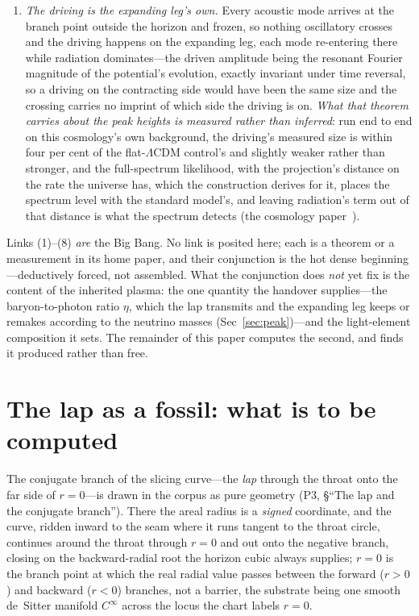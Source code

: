 \documentclass[11pt,a4paper]{article}
\theoremstyle{plain}
\theoremstyle{definition}
\theoremstyle{remark}
\begin{document}
\begin{enumerate}
\item \emph{The driving is the expanding leg's own.} Every acoustic mode arrives at the branch point outside
the horizon and frozen, so nothing oscillatory crosses and the driving happens on the expanding leg, each mode
re-entering there while radiation dominates---the driven amplitude being the resonant Fourier magnitude of the
potential's evolution, exactly invariant under time reversal, so a driving on the contracting side would have
been the same size and the crossing carries no imprint of which side the driving is on.
\emph{What that theorem carries about the peak heights is measured rather than inferred}: run end to end on
this cosmology's own background, the driving's measured size is within four per cent of the
flat-$\Lambda$CDM control's and slightly weaker rather than stronger, and the full-spectrum likelihood,
with the projection's distance on the rate the universe has, which the construction derives for it, places the spectrum level with the standard model's, and leaving radiation's term out of that distance is what the spectrum detects (the cosmology paper~\cite{JanzenCRcosmology}).
\end{enumerate}

Links (1)--(8) \emph{are} the Big Bang. No link is posited here; each is a theorem or a
measurement in its home paper, and their conjunction is the hot dense beginning---deductively
forced, not assembled. What the conjunction does \emph{not} yet fix is the content of the
inherited plasma: the one quantity the handover supplies---the baryon-to-photon ratio $\eta$, which the
lap transmits and the expanding leg keeps or remakes according to the neutrino masses
(Sec~\ref{sec:peak})---and the light-element composition it sets. The remainder of this paper
computes the second, and finds it produced rather than free.

\section{The lap as a fossil: what is to be computed}\label{sec:lap}
The conjugate branch of the slicing curve---the \emph{lap} through the throat onto the far side of
$r=0$---is drawn in the corpus as pure geometry (P3, \S``The lap and the conjugate branch''). There
the areal radius is a \emph{signed} coordinate, and the curve, ridden inward to the seam where it
runs tangent to the throat circle, continues around the throat through $r=0$ and out onto the
negative branch, closing on the backward-radial root the horizon cubic always supplies; $r=0$ is
the branch point at which the real radial value passes between the forward ($r>0$) and backward
($r<0$) branches, not a barrier, the substrate being one smooth de~Sitter manifold $C^\infty$
across the locus the chart labels $r=0$. 
\end{document}
